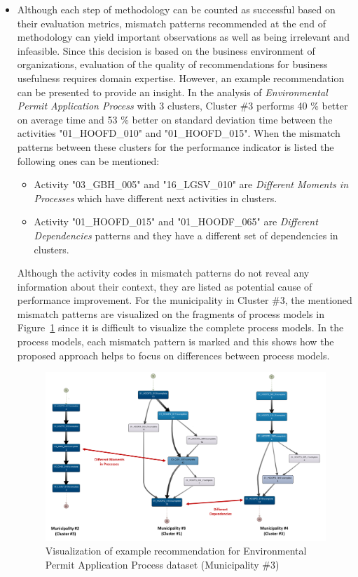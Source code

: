 \begin{itemize}
	\item Although each step of methodology can be counted as successful based on their evaluation metrics, mismatch patterns recommended at the end of methodology can yield important observations as well as being irrelevant and infeasible. Since this decision is based on the business environment of organizations, evaluation of the quality of recommendations for business usefulness requires domain expertise. However, an example recommendation can be presented to provide an insight. In the analysis of \textit{Environmental Permit Application Process} with 3 clusters, Cluster \#3 performs 40 \% better on average time and 53 \% better on standard deviation time between the activities "01\_HOOFD\_010" and "01\_HOOFD\_015". When the mismatch patterns between these clusters for the performance indicator is listed the following ones can be mentioned:
		\begin{itemize}
			\item Activity "03\_GBH\_005" and "16\_LGSV\_010"  are \textit{Different Moments in Processes} which have different next activities in clusters.
			\item Activity "01\_HOOFD\_015"  and "01\_HOODF\_065" are \textit{Different Dependencies} patterns and they have a different set of dependencies in clusters.
 		\end{itemize}
	Although the activity codes in mismatch patterns do not reveal any information about their context, they are listed as potential cause of performance improvement. For the municipality in Cluster \#3, the mentioned mismatch patterns are visualized on the fragments of process models in Figure~\ref{fig:coselog-wabo-recommendation-visualization-mun-3} since it is difficult to visualize the complete process models. In the process models, each mismatch pattern is marked and this shows how the proposed approach helps to focus on differences between process models.
		\begin{figure}
			\centering
			\includegraphics[width=\textwidth]{5_results_discussions/coselog-wabo/recommendation-visualization-mun-3}
			\caption{Visualization of example recommendation for Environmental Permit Application Process dataset (Municipality \#3)}
		  \label{fig:coselog-wabo-recommendation-visualization-mun-3}
		\end{figure} 

\end{itemize} %